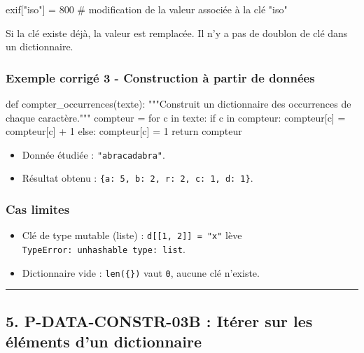\begin{python}
exif["iso"] = 800  # modification de la valeur associée à la clé "iso"
\end{python}

Si la clé existe déjà, la valeur est remplacée. Il n'y a pas de doublon
de clé dans un dictionnaire.

\subsubsection{Exemple corrigé 3 - Construction à partir de données}

\begin{python}
def compter_occurrences(texte):
    """Construit un dictionnaire des occurrences de chaque caractère."""
    compteur = {}
    for c in texte:
        if c in compteur:
            compteur[c] = compteur[c] + 1
        else:
            compteur[c] = 1
    return compteur
\end{python}

\begin{itemize}
\tightlist
\item
  Donnée étudiée : \texttt{"abracadabra"}.
\item
  Résultat obtenu :
  \texttt{\{\textquotesingle{}a\textquotesingle{}:\ 5,\ \textquotesingle{}b\textquotesingle{}:\ 2,\ \textquotesingle{}r\textquotesingle{}:\ 2,\ \textquotesingle{}c\textquotesingle{}:\ 1,\ \textquotesingle{}d\textquotesingle{}:\ 1\}}.
\end{itemize}

\subsubsection{Cas limites}

\begin{itemize}
\tightlist
\item
  Clé de type mutable (liste) : \texttt{d{[}{[}1,\ 2{]}{]}\ =\ "x"} lève
  \texttt{TypeError:\ unhashable\ type:\ \textquotesingle{}list\textquotesingle{}}.
\item
  Dictionnaire vide : \texttt{len(\{\})} vaut \texttt{0}, aucune clé
  n'existe.
\end{itemize}

\begin{center}\rule{0.5\linewidth}{0.5pt}\end{center}

\subsection{5. P-DATA-CONSTR-03B : Itérer sur les éléments d’un dictionnaire}

